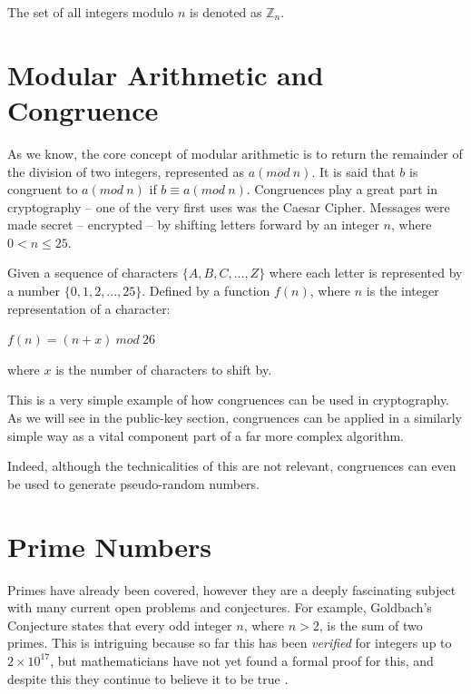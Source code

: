 \begin{mathdef}
	The set of all integers modulo $n$ is denoted as $\mathbb{Z}_n$.
\end{mathdef}

\section{Modular Arithmetic and Congruence}

  As we know, the core concept of modular arithmetic is to return the remainder of the division of two integers, represented as $a(mod \ n)$. It is said that $b$ is congruent to $a(mod \ n)$ if $b \equiv a(mod \ n)$. Congruences play a great part in cryptography -- one of the very first uses was the Caesar Cipher. Messages were made secret -- encrypted -- by shifting letters forward by an integer $n$, where $0 < n \leq 25$.
  
  Given a sequence of characters $\{A,B,C,...,Z\}$ where each letter is represented by a number $\{0,1,2,...,25\}$. Defined by a function $f(n)$, where $n$ is the integer representation of a character:
  
    \begin{center}
       $f(n) = (n + x) \ mod \ 26$
    \end{center}
    
  where $x$ is the number of characters to shift by.
  
  This is a very simple example of how congruences can be used in cryptography. As we will see in the public-key section, congruences can be applied in a similarly simple way as a vital component part of a far more complex algorithm.
  
  Indeed, although the technicalities of this are not relevant, congruences can even be used to generate pseudo-random numbers.

\section{Prime Numbers}

Primes have already been covered, however they are a deeply fascinating subject with many current open problems and conjectures. For example, Goldbach's Conjecture states that every odd integer $n$, where $n > 2$, is the sum of two primes. This is intriguing because so far this has been \emph{verified} for integers up to $2 \times 10^{17}$, but mathematicians have not yet found a formal proof for this, and despite this they continue to believe it to be true \cite{Rosen:2007aa}.


